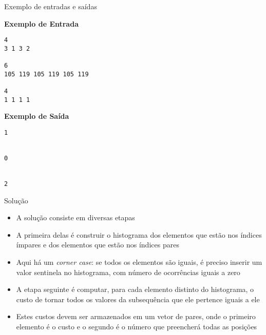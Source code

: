 \begin{frame}[fragile]{Exemplo de entradas e saídas}
\begin{minipage}[t]{0.5\textwidth}
\textbf{Exemplo de Entrada}
\begin{verbatim}
4
3 1 3 2

6
105 119 105 119 105 119

4
1 1 1 1
\end{verbatim}
\end{minipage}
\begin{minipage}[t]{0.45\textwidth}
\textbf{Exemplo de Saída}
\begin{verbatim}
1


0


2
\end{verbatim}
\end{minipage}
\end{frame}

\begin{frame}[fragile]{Solução}

    \begin{itemize}
        \item A solução consiste em diversas etapas

        \item A primeira delas é construir o histograma dos elementos que estão nos índices
            ímpares e dos elementos que estão nos índices pares

        \item Aqui há um \textit{corner case}: se todos os elementos são iguais, é preciso
            inserir um valor sentinela no histograma, com número de ocorrências iguais a zero

        \item A etapa seguinte é computar, para cada elemento distinto do histograma, o custo de 
            tornar todos os valores da subsequência que ele pertence iguais a ele

        \item Estes custos devem ser armazenados em um vetor de pares, onde o primeiro elemento
            é o custo e o segundo é o número que preencherá todas as posições
    \end{itemize}

\end{frame}

